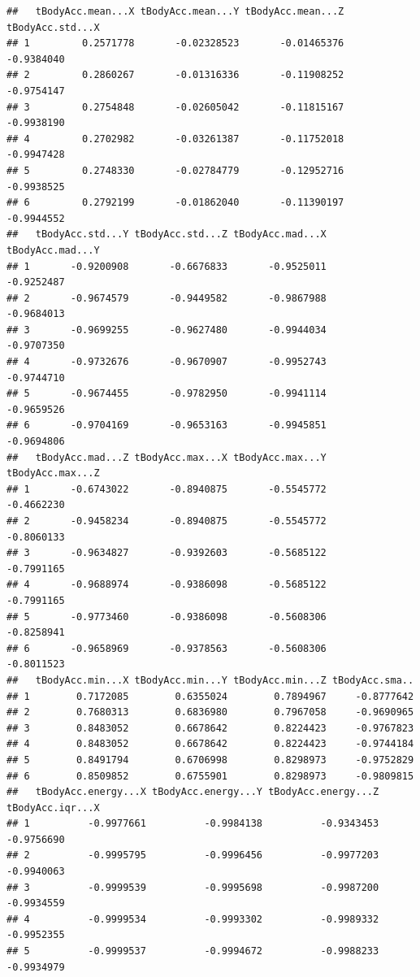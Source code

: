 \documentclass[
]{article}
\begin{document}
\begin{verbatim}
##   tBodyAcc.mean...X tBodyAcc.mean...Y tBodyAcc.mean...Z tBodyAcc.std...X
## 1         0.2571778       -0.02328523       -0.01465376       -0.9384040
## 2         0.2860267       -0.01316336       -0.11908252       -0.9754147
## 3         0.2754848       -0.02605042       -0.11815167       -0.9938190
## 4         0.2702982       -0.03261387       -0.11752018       -0.9947428
## 5         0.2748330       -0.02784779       -0.12952716       -0.9938525
## 6         0.2792199       -0.01862040       -0.11390197       -0.9944552
##   tBodyAcc.std...Y tBodyAcc.std...Z tBodyAcc.mad...X tBodyAcc.mad...Y
## 1       -0.9200908       -0.6676833       -0.9525011       -0.9252487
## 2       -0.9674579       -0.9449582       -0.9867988       -0.9684013
## 3       -0.9699255       -0.9627480       -0.9944034       -0.9707350
## 4       -0.9732676       -0.9670907       -0.9952743       -0.9744710
## 5       -0.9674455       -0.9782950       -0.9941114       -0.9659526
## 6       -0.9704169       -0.9653163       -0.9945851       -0.9694806
##   tBodyAcc.mad...Z tBodyAcc.max...X tBodyAcc.max...Y tBodyAcc.max...Z
## 1       -0.6743022       -0.8940875       -0.5545772       -0.4662230
## 2       -0.9458234       -0.8940875       -0.5545772       -0.8060133
## 3       -0.9634827       -0.9392603       -0.5685122       -0.7991165
## 4       -0.9688974       -0.9386098       -0.5685122       -0.7991165
## 5       -0.9773460       -0.9386098       -0.5608306       -0.8258941
## 6       -0.9658969       -0.9378563       -0.5608306       -0.8011523
##   tBodyAcc.min...X tBodyAcc.min...Y tBodyAcc.min...Z tBodyAcc.sma..
## 1        0.7172085        0.6355024        0.7894967     -0.8777642
## 2        0.7680313        0.6836980        0.7967058     -0.9690965
## 3        0.8483052        0.6678642        0.8224423     -0.9767823
## 4        0.8483052        0.6678642        0.8224423     -0.9744184
## 5        0.8491794        0.6706998        0.8298973     -0.9752829
## 6        0.8509852        0.6755901        0.8298973     -0.9809815
##   tBodyAcc.energy...X tBodyAcc.energy...Y tBodyAcc.energy...Z tBodyAcc.iqr...X
## 1          -0.9977661          -0.9984138          -0.9343453       -0.9756690
## 2          -0.9995795          -0.9996456          -0.9977203       -0.9940063
## 3          -0.9999539          -0.9995698          -0.9987200       -0.9934559
## 4          -0.9999534          -0.9993302          -0.9989332       -0.9952355
## 5          -0.9999537          -0.9994672          -0.9988233       -0.9934979

\end{verbatim}
\end{document}
